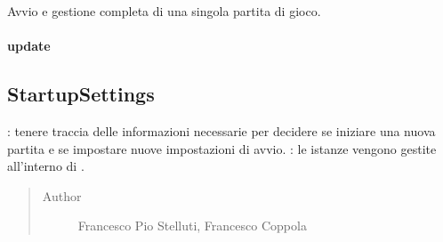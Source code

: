 \documentclass[letterpaper,10pt,italian,openany,oneside]{sphinxmanual}
\begin{document}
\begin{fulllineitems}
\label{\detokenize{source/it/unicam/cs/pa/mastermind/gamecore/SingleMatch:it.unicam.cs.pa.mastermind.gamecore.SingleMatch.start()}}
Avvio e gestione completa di una singola partita di gioco.

\end{fulllineitems}



\paragraph{update}
\label{\detokenize{source/it/unicam/cs/pa/mastermind/gamecore/SingleMatch:update}}

\begin{fulllineitems}
\label{\detokenize{source/it/unicam/cs/pa/mastermind/gamecore/SingleMatch:it.unicam.cs.pa.mastermind.gamecore.SingleMatch.update(Observable)}}
\end{fulllineitems}



\subsection{StartupSettings}
\label{\detokenize{source/it/unicam/cs/pa/mastermind/gamecore/StartupSettings:startupsettings}}\label{\detokenize{source/it/unicam/cs/pa/mastermind/gamecore/StartupSettings::doc}}

\begin{fulllineitems}
\label{\detokenize{source/it/unicam/cs/pa/mastermind/gamecore/StartupSettings:it.unicam.cs.pa.mastermind.gamecore.StartupSettings}}
: tenere traccia delle informazioni necessarie per decidere se iniziare una nuova partita e se impostare nuove impostazioni di avvio. : le istanze vengono gestite all’interno di .
\begin{quote}\begin{description}
\item[{Author}] \leavevmode
Francesco Pio Stelluti, Francesco Coppola

\end{description}\end{quote}

\end{fulllineitems}
\end{document}
